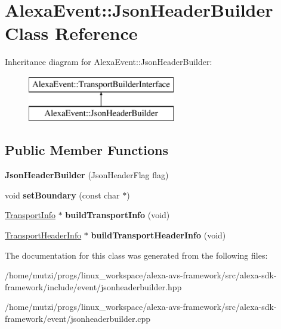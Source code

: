 \hypertarget{classAlexaEvent_1_1JsonHeaderBuilder}{}\section{Alexa\+Event\+:\+:Json\+Header\+Builder Class Reference}
\label{classAlexaEvent_1_1JsonHeaderBuilder}
Inheritance diagram for Alexa\+Event\+:\+:Json\+Header\+Builder\+:\begin{figure}[H]
\begin{center}
\leavevmode
\includegraphics[height=2.000000cm]{db/d8e/classAlexaEvent_1_1JsonHeaderBuilder}
\end{center}
\end{figure}
\subsection*{Public Member Functions}
\begin{DoxyCompactItemize}
\item 
\mbox{\label{classAlexaEvent_1_1JsonHeaderBuilder_a57911c313234d7a5e529e1994e8dc55f}} 
{\bfseries Json\+Header\+Builder} (Json\+Header\+Flag flag)
\item 
\mbox{\label{classAlexaEvent_1_1JsonHeaderBuilder_ad2de51e1e344b038415fa01b9b82d699}} 
void {\bfseries set\+Boundary} (const char $\ast$)
\item 
\mbox{\label{classAlexaEvent_1_1JsonHeaderBuilder_a4ed3ea23a2297b1bd5afb6b21133869e}} 
\hyperlink{classAlexaEvent_1_1TransportInfo}{Transport\+Info} $\ast$ {\bfseries build\+Transport\+Info} (void)
\item 
\mbox{\label{classAlexaEvent_1_1JsonHeaderBuilder_a28eb58ff2eb4c4db2e88bcb79afbd2ba}} 
\hyperlink{classAlexaEvent_1_1TransportHeaderInfo}{Transport\+Header\+Info} $\ast$ {\bfseries build\+Transport\+Header\+Info} (void)
\end{DoxyCompactItemize}


The documentation for this class was generated from the following files\+:\begin{DoxyCompactItemize}
\item 
/home/mutzi/progs/linux\+\_\+workspace/alexa-\/avs-\/framework/src/alexa-\/sdk-\/framework/include/event/jsonheaderbuilder.\+hpp\item 
/home/mutzi/progs/linux\+\_\+workspace/alexa-\/avs-\/framework/src/alexa-\/sdk-\/framework/event/jsonheaderbuilder.\+cpp\end{DoxyCompactItemize}
